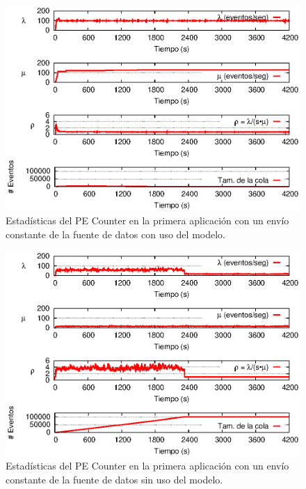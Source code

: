 \begin{figure}[!ht]
\centering
    \includegraphics[scale=1.1]{images/exp/app1/uniform/cm/statusCounterPE.eps}
    \caption{Estad\'isticas del PE Counter en la primera aplicaci\'on con un env\'io constante de la fuente de datos con uso del modelo.}
    \label{fig:app1-uniform-statusCounterPE-cm}
\end{figure}

\begin{figure}[!ht]
\centering
    \includegraphics[scale=1.1]{images/exp/app1/uniform/sm/statusCounterPE.eps}
    \caption{Estad\'isticas del PE Counter en la primera aplicaci\'on con un env\'io constante de la fuente de datos sin uso del modelo.}
    \label{fig:app1-uniform-statusCounterPE-sm}
\end{figure}

